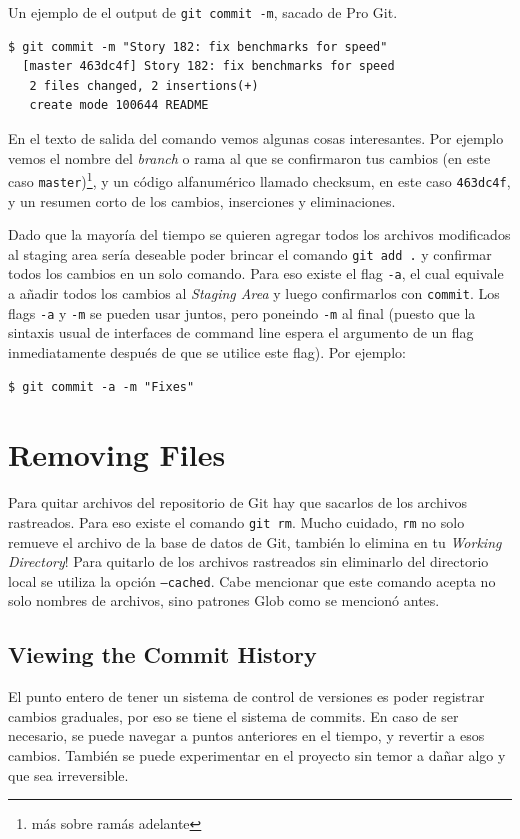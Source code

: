 \documentclass[spanish, 12pt, a4paper]{article}
\begin{document}
Un ejemplo de el output de \texttt{git commit -m}, sacado de Pro Git.
\begin{lstlisting}
$ git commit -m "Story 182: fix benchmarks for speed"
  [master 463dc4f] Story 182: fix benchmarks for speed
   2 files changed, 2 insertions(+)
   create mode 100644 README
\end{lstlisting}

En el texto de salida del comando vemos algunas cosas interesantes.
Por ejemplo vemos el nombre del \textit{branch} o rama al que se confirmaron tus cambios (en este caso \texttt{master})\footnote{más sobre ramás adelante}, y un código alfanumérico llamado checksum, en este caso \texttt{463dc4f}, y un resumen corto de los cambios, inserciones y eliminaciones.

Dado que la mayoría del tiempo se quieren agregar todos los archivos modificados al staging area sería deseable poder brincar el comando \texttt{git add .} y confirmar todos los cambios en un solo comando.
Para eso existe el flag \texttt{-a}, el cual equivale a añadir todos los cambios al \textit{Staging Area} y luego confirmarlos con \texttt{commit}.
Los flags \texttt{-a} y \texttt{-m} se pueden usar juntos, pero poneindo \texttt{-m} al final (puesto que la sintaxis usual de interfaces de command line espera el argumento de un flag inmediatamente después de que se utilice este flag).
Por ejemplo:
\begin{lstlisting}
$ git commit -a -m "Fixes"
\end{lstlisting}

\section{Removing Files}
Para quitar archivos del repositorio de Git hay que sacarlos de los archivos rastreados.
Para eso existe el comando \texttt{git rm}.
Mucho cuidado, \texttt{rm} no solo remueve el archivo de la base de datos de Git, también lo elimina en tu \textit{Working Directory}!
Para quitarlo de los archivos rastreados sin eliminarlo del directorio local se utiliza la opción \texttt{--cached}.
Cabe mencionar que este comando acepta no solo nombres de archivos, sino patrones Glob como se mencionó antes.

\subsection{Viewing the Commit History}
El punto entero de tener un sistema de control de versiones es poder registrar cambios graduales, por eso se tiene el sistema de commits.
En caso de ser necesario, se puede navegar a puntos anteriores en el tiempo, y revertir a esos cambios.
También se puede experimentar en el proyecto sin temor a dañar algo y que sea irreversible.
\end{document}
